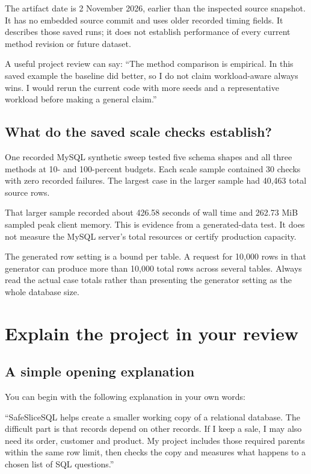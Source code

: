 \documentclass[12pt,a4paper,oneside]{report}
\begin{document}
The artifact date is 2 November 2026, earlier than the inspected source snapshot. It has no embedded source commit and uses older recorded timing fields. It describes those saved runs; it does not establish performance of every current method revision or future dataset.

A useful project review can say: ``The method comparison is empirical. In this saved example the baseline did better, so I do not claim workload-aware always wins. I would rerun the current code with more seeds and a representative workload before making a general claim.''

\section{What do the saved scale checks establish?}
One recorded MySQL synthetic sweep tested five schema shapes and all three methods at 10- and 100-percent budgets. Each scale sample contained 30 checks with zero recorded failures. The largest case in the larger sample had 40,463 total source rows.

That larger sample recorded about 426.58 seconds of wall time and 262.73 MiB sampled peak client memory. This is evidence from a generated-data test. It does not measure the MySQL server's total resources or certify production capacity.

The generated row setting is a bound per table. A request for 10,000 rows in that generator can produce more than 10,000 total rows across several tables. Always read the actual case totals rather than presenting the generator setting as the whole database size.

\chapter{Explain the project in your review}
\section{A simple opening explanation}
You can begin with the following explanation in your own words:

``SafeSliceSQL helps create a smaller working copy of a relational database. The difficult part is that records depend on other records. If I keep a sale, I may also need its order, customer and product. My project includes those required parents within the same row limit, then checks the copy and measures what happens to a chosen list of SQL questions.''
\end{document}
